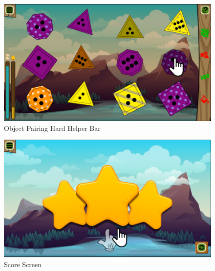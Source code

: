 \begin{figure}[H]
    \centering
    \includegraphics[width=1\textwidth]{figures/gamehardhelp}
    \caption{Object Pairing Hard Helper Bar}
    \label{fig:gamehardhelp}
\end{figure}

\begin{figure}[H]
    \centering
    \includegraphics[width=1\textwidth]{figures/scorescreen}
    \caption{Score Screen}
    \label{fig:scorescreen}
\end{figure}
